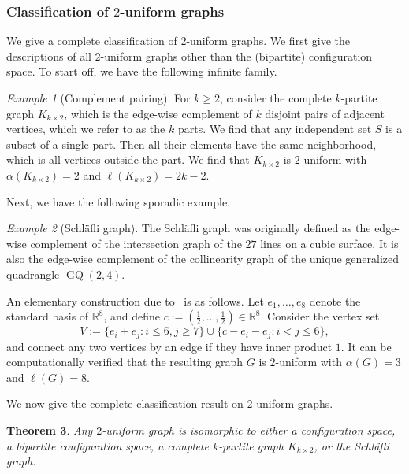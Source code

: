 \documentclass{article}
\theoremstyle{plain}
\newtheorem{theorem}{Theorem}[section]
\theoremstyle{remark}
\newtheorem{example}[theorem]{Example}
\theoremstyle{plain}
\numberwithin{equation}{section}
\DeclareMathOperator{\GQ}{GQ}
\begin{document}
	\subsubsection{Classification of $2$-uniform graphs}
	
	We give a complete classification of $2$-uniform graphs. We first give the descriptions of all $2$-uniform graphs other than the (bipartite) configuration space. To start off, we have the following infinite family.
	
	\begin{example}[Complement pairing]
		For $k\geq2$, consider the complete $k$-partite graph $K_{k\times2}$, which is the edge-wise complement of $k$ disjoint pairs of adjacent vertices, which we refer to as the $k$ parts. We find that any independent set $S$ is a subset of a single part. Then all their elements have the same neighborhood, which is all vertices outside the part. We find that $K_{k\times2}$ is $2$-uniform with $\alpha(K_{k\times2})=2$ and $\ell(K_{k\times2})=2k-2$.
	\end{example}
	
	Next, we have the following sporadic example.
	
	\begin{example}[Schl\"afli graph]
		The Schl\"afli graph was originally defined as the edge-wise complement of the intersection graph of the $27$ lines on a cubic surface. It is also the edge-wise complement of the collinearity graph of the unique generalized quadrangle $\GQ(2,4)$.
		
		An elementary construction due to~\cite{Bussemaker1992ExceptionalGW} is as follows. Let $e_1,\ldots,e_8$ denote the standard basis of $\mathbb{R}^8$, and define $c:=(\frac12,\ldots,\frac12)\in\mathbb{R}^8$. Consider the vertex set $$V:=\{e_i+e_j:i\leq6,j\geq7\}\cup\{c-e_i-e_j:i<j\leq6\},$$ and connect any two vertices by an edge if they have inner product $1$. It can be computationally verified that the resulting graph $G$ is $2$-uniform with $\alpha(G)=3$ and $\ell(G)=8$.
	\end{example}
	
	We now give the complete classification result on $2$-uniform graphs.
	
	\begin{theorem}\label{theorem_classification}
		Any $2$-uniform graph is isomorphic to either a configuration space, a bipartite configuration space, a complete $k$-partite graph $K_{k\times 2}$, or the Schl\"afli graph.
	\end{theorem}
	
\end{document}
